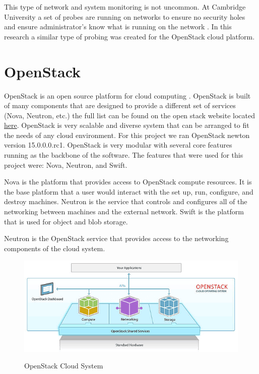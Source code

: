 \documentclass[12pt]{article}
\begin{document}
This type of network and system monitoring is not uncommon. At Cambridge University a set of probes are running on networks to ensure no security holes and ensure administrator's know what is running on the network \cite{CambUni}. In this research a similar type of probing was created for the OpenStack cloud platform.


\section{OpenStack}
OpenStack is an open source platform for cloud computing \cite{wiki:OpenStack}. OpenStack is built of many components that are designed to provide a different set of services (Nova, Neutron, etc.) the full list can be found on the open stack website located \href{https://www.openstack.org/software/project-navigator/}{here}. OpenStack is very scalable and diverse system that can be arranged to fit the needs of any cloud environment. For this project we ran OpenStack newton version 15.0.0.0.rc1. OpenStack is very modular with several core features running as the backbone of the software. The features that were used for this project were: Nova, Neutron, and Swift.

Nova is the platform that provides access to OpenStack compute resources. It is the base platform that a user would interact with the set up, run, configure, and destroy machines. Neutron is the service that controls and configures all of the networking between machines and the external network. Swift is the platform that is used for object and blob storage.

Neutron is the OpenStack service that provides access to the networking components of the cloud system.

\begin{figure}[H]
    \centering
    \includegraphics[scale=.6]{./pic/openstack-sm.png}
    \label{fig:Hypervisors}
    \caption{OpenStack Cloud System}
\end{figure}
\end{document}
